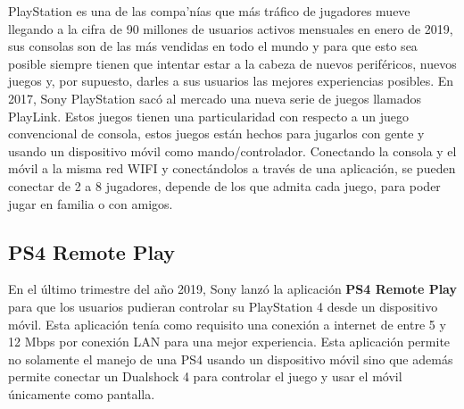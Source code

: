 PlayStation es una de las compa'n\'ias que m\'as tr\'afico de jugadores mueve llegando a la cifra de 90 millones de usuarios activos mensuales en enero de 2019, sus consolas son de las m\'as vendidas en todo el mundo y para que esto sea posible siempre tienen que intentar estar a la cabeza de nuevos perif\'ericos, nuevos juegos y, por supuesto, darles a sus usuarios las mejores experiencias posibles. En 2017, Sony PlayStation sac\'o al mercado una nueva serie de juegos llamados PlayLink. Estos juegos tienen una particularidad con respecto a un juego convencional de consola, estos juegos est\'an hechos para jugarlos con gente y usando un dispositivo m\'ovil como mando/controlador. Conectando la consola y el m\'ovil a la misma red WIFI y conect\'andolos a trav\'es de una aplicaci\'on, se pueden conectar de 2 a 8 jugadores, depende de los que admita cada juego, para poder jugar en familia o con amigos.

\subsection{PS4 Remote Play}
\label{cap2:subsec:ps4-remote-play}

En el \'ultimo trimestre del a\~no 2019, Sony lanz\'o la aplicaci\'on \textbf{PS4 Remote Play} para que los usuarios pudieran controlar su PlayStation 4 desde un dispositivo m\'ovil. Esta aplicaci\'on ten\'ia como requisito una conexi\'on a internet de entre 5 y 12 Mbps por conexi\'on LAN para una mejor experiencia. Esta aplicaci\'on permite no solamente el manejo de una PS4 usando un dispositivo m\'ovil sino que adem\'as permite conectar un Dualshock 4 para controlar el juego y usar el m\'ovil \'unicamente como pantalla.


